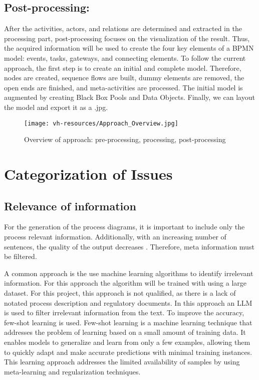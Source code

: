 \subsection{Post-processing:} 
After the activities, actors, and relations are determined and extracted in the processing part, post-processing focuses on the visualization of the result. 
Thus, the acquired information will be used to create the four key elements of a BPMN model: events, tasks, gateways, and connecting elements.
To follow the current approach, the first step is to create an initial and complete model. Therefore, nodes are created, sequence flows are built, dummy elements are removed, the open ends are finished, and meta-activities are processed. The initial model is augmented by creating Black Box Pools and Data Objects. Finally, we can layout the model and export it as a .jpg.

\pagebreak

\begin{figure}[H]
    \centering
    \caption{Overview of approach: pre-processing, processing, post-processing}
    \texttt{[image: vh-resources/Approach\_Overview.jpg]}
    \label{fig:Approach_Overview}
\end{figure}
\pagebreak

\section{Categorization of Issues}
\subsection{Relevance of information}
For the generation of the process diagrams, it is important to include only the process relevant information. Additionally, with an increasing number of sentences, the quality of the output decreases \cite{yuImprovedAutogenerationBusiness2023}. Therefore, meta information must be filtered.

A common approach is the use machine learning algorithms to identify irrelevant information. For this approach the algorithm will be trained with using a large dataset.  For this project, this approach is not qualified, as there is a lack of notated process description and regulatory documents. In this approach an LLM is used to filter irrelevant information from the text. To improve the accuracy, few-shot learning is used. Few-shot learning is a machine learning technique that addresses the problem of learning based on a small amount of training data. It enables models to generalize and learn from only a few examples, allowing them to quickly adapt and make accurate predictions with minimal training instances.  This learning approach addresses the limited availability of samples by using meta-learning and regularization techniques.

